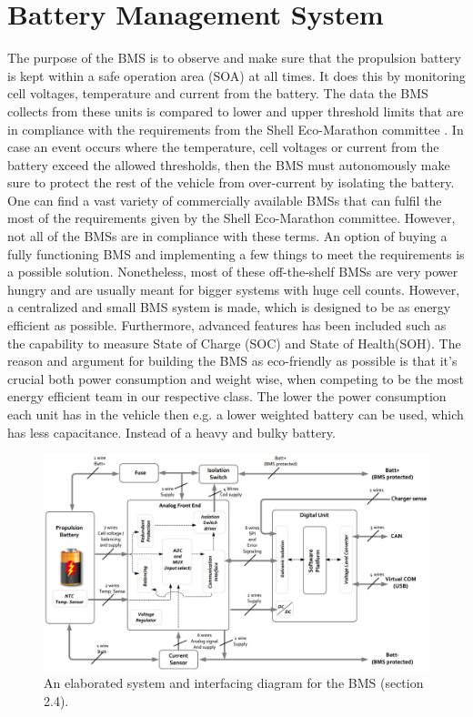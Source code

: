 \section{Battery Management System}
\label{sec:BMSHWChapter}
The purpose of the BMS is to observe and make sure that the propulsion battery is kept within a safe operation area (SOA) at all times. It does this by monitoring cell voltages, temperature and current from the battery. The data the BMS collects from these units is compared to lower and upper threshold limits that are in compliance with the requirements from the Shell Eco-Marathon committee \cite{ShellRequirements}. In case an event occurs where the temperature, cell voltages or current from the battery exceed the allowed thresholds, then the BMS must autonomously make sure to protect the rest of the vehicle from over-current by isolating the battery. \\
One can find a vast variety of commercially available BMSs that can fulfil the most of the requirements given by the Shell Eco-Marathon committee. However, not all of the BMSs are in compliance with these terms. An option of buying a fully functioning BMS and implementing a few things to meet the requirements is a possible solution. Nonetheless, most of these off-the-shelf BMSs are very power hungry and are usually meant for bigger systems with huge cell counts. However, a centralized and small BMS system is made, which is designed to be as energy efficient as possible. Furthermore, advanced features has been included such as the capability to measure State of Charge (SOC) and State of Health(SOH). The reason and argument for building the BMS as eco-friendly as possible is that it's crucial both power consumption and weight wise, when competing to be the most energy efficient team in our respective class. The lower the power consumption each unit has in the vehicle then e.g. a lower weighted battery can be used, which has less capacitance. Instead of a heavy and bulky battery.\\

\begin{figure}[H]
	\centering
	\includegraphics[width=1.0\linewidth]{Hardware/Pictures/BMSOverview}
	\caption[Empty]{An elaborated system and interfacing diagram for the BMS \cite{BMSDocumentation} (section 2.4).}
	\label{fig:BMSOverview}
\end{figure}

